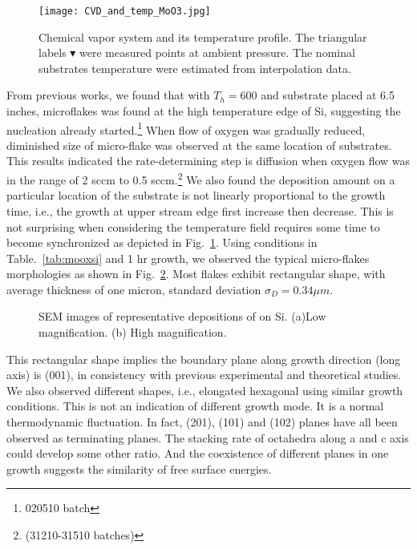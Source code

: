\begin{figure}[htb]
\centering
\texttt{[image: CVD\_and\_temp\_MoO3.jpg]}
\caption[Growth setup of ]{Chemical vapor system and its temperature profile. The triangular labels $\blacktriangledown$ were measured points at ambient pressure. The nominal substrates temperature were estimated from interpolation data.}
\label{fig:mooxgrowth}
\end{figure}

From previous works,\cite{predeep2011} we found that with $T_h = 600$ and substrate placed at 6.5 inches, microflakes was found at the high temperature edge of Si, suggesting the nucleation already started.\footnote{020510 batch} When flow of oxygen was gradually reduced, diminished size of micro-flake was observed at the same location of substrates. This results indicated the rate-determining step is diffusion when oxygen flow was in the range of 2 sccm to 0.5 sccm.\footnote{(31210-31510 batches)} We also found the deposition amount on a particular location of the substrate is not linearly proportional to the growth time, i.e., the growth at upper stream edge first increase then decrease. This is not surprising when considering the temperature field requires some time to become synchronized as depicted in Fig.~\ref{fig:mooxgrowth}. Using conditions in Table.~\ref{tab:mooxsi} and 1 hr growth, we observed the typical micro-flakes morphologies as shown in Fig.~\ref{fig:mosisem}. Most flakes exhibit rectangular shape, with average thickness of one micron, standard deviation $\sigma_D=0.34\mu m$.

\begin{figure}[htb]
\centering
{}\hspace{0.04\textwidth}
\caption[Representative morphologies of  on Si]{SEM images of representative depositions of  on Si. (a)Low magnification. (b) High magnification. }
\label{fig:mosisem}
\end{figure}

This rectangular shape implies the boundary plane along growth direction (long axis) is (001), in consistency with previous experimental\cite{Zeng1998,Li2002b} and theoretical\cite{Firment1983,Cora1997} studies. We also observed different shapes, i.e., elongated hexagonal using similar growth conditions. This is not an indication of different growth mode. It is a normal thermodynamic fluctuation. In fact, (201), (101) and (102) planes have all been observed as terminating planes.\cite{Zeng1998} The stacking rate of  octahedra along a and c axis could develop some other ratio. And the coexistence of different planes in one growth suggests the similarity of free surface energies.

